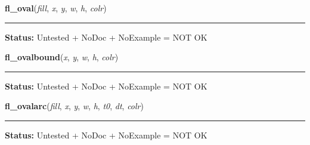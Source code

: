 \hspace{.8\funcindent}\begin{boxedminipage}{\funcwidth}

    \raggedright \textbf{fl\_oval}(\textit{fill}, \textit{x}, \textit{y}, \textit{w}, \textit{h}, \textit{colr})

    \vspace{-1.5ex}

    \rule{\textwidth}{0.5\fboxrule}
\setlength{\parskip}{2ex}
\setlength{\parskip}{1ex}
\textbf{Status:} Untested + NoDoc + NoExample = NOT OK



    \end{boxedminipage}

    \label{xformslib:library:fl_ovalbound}

    \vspace{0.5ex}

\hspace{.8\funcindent}\begin{boxedminipage}{\funcwidth}

    \raggedright \textbf{fl\_ovalbound}(\textit{x}, \textit{y}, \textit{w}, \textit{h}, \textit{colr})

    \vspace{-1.5ex}

    \rule{\textwidth}{0.5\fboxrule}
\setlength{\parskip}{2ex}
\setlength{\parskip}{1ex}
\textbf{Status:} Untested + NoDoc + NoExample = NOT OK



    \end{boxedminipage}

    \label{xformslib:library:fl_ovalarc}

    \vspace{0.5ex}

\hspace{.8\funcindent}\begin{boxedminipage}{\funcwidth}

    \raggedright \textbf{fl\_ovalarc}(\textit{fill}, \textit{x}, \textit{y}, \textit{w}, \textit{h}, \textit{t0}, \textit{dt}, \textit{colr})

    \vspace{-1.5ex}

    \rule{\textwidth}{0.5\fboxrule}
\setlength{\parskip}{2ex}
\setlength{\parskip}{1ex}
\textbf{Status:} Untested + NoDoc + NoExample = NOT OK



    \end{boxedminipage}


